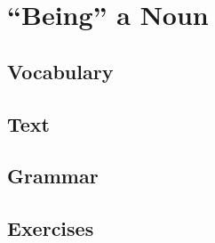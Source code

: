 \chapter{``Being'' a Noun}
\section*{Vocabulary}
\section*{Text}
\section*{Grammar}
\section*{Exercises}

